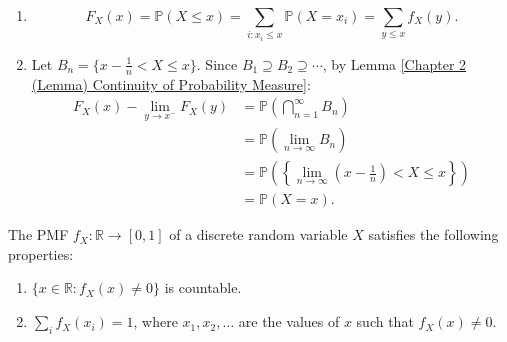 \documentclass{huhtakm-template-book-v2}
\newcommand{\prob}{\mathbb{P}}
\begin{document}
    \begin{proofing}
        \begin{enumerate}
            \item 
            \begin{equation*}
                F_{X}(x) = \prob(X \leq x) = \sum_{i:x_{i} \leq x}\prob(X = x_{i}) = \sum_{y \leq x}f_{X}(y).
            \end{equation*}
            \item Let $B_{n} = \big\{x-\frac{1}{n} < X \leq x\big\}$. Since $B_{1}\supseteq B_{2}\supseteq\cdots$, by Lemma \ref{Chapter 2 (Lemma) Continuity of Probability Measure}:
            \begin{align*}
                F_{X}(x)-\lim_{y \to x^{-}}F_{X}(y) &= \prob\left(\bigcap_{n = 1}^{\infty}B_{n}\right)\\
                &= \prob\left(\lim_{n \to \infty}B_{n}\right)\\
                &= \prob\left(\left\{\lim_{n \to \infty}\left(x-\frac{1}{n}\right) < X \leq x\right\}\right)\\
                &= \prob(X = x).
            \end{align*}
        \end{enumerate}
    \end{proofing}
    \begin{lem}
        The PMF $f_{X}:\mathbb{R} \to [0,1]$ of a discrete random variable $X$ satisfies the following properties:
        \begin{enumerate}
            \item $\{x \in \mathbb{R} : f_{X}(x) \neq 0\}$ is countable.
            \item $\sum_{i}f_{X}(x_{i}) = 1$, where $x_{1},x_{2},\dots$ are the values of $x$ such that $f_{X}(x) \neq 0$.
        \end{enumerate}
    \end{lem}
    \newpage
\end{document}
